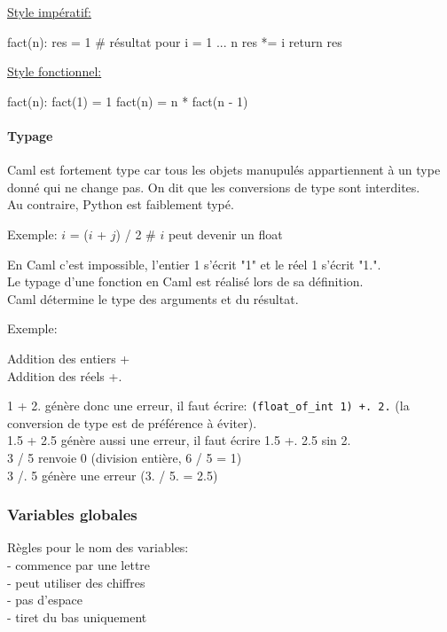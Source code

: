 \documentclass{article}
\newcommand{\code}[1]{\lstinline[style = mystyle]{#1}}
\begin{document}
						\underline{Style impératif:}
						
							\begin{case}
fact(n):
	res = 1 # résultat
	pour i = 1 ... n
		res *= i
	return res
							\end{case}
								
						\underline{Style fonctionnel:}
					
							\begin{case}
fact(n):
	fact(1) = 1
	fact(n) = n * fact(n - 1)
							\end{case}

				\paragraph{Typage}
				
					Caml est fortement type car tous les objets manupulés appartiennent à un type donné qui ne change pas. On dit que les conversions de type sont interdites.\\
					Au contraire, Python est faiblement typé.
					
					Exemple: $i$ = ($i$ + $j$) / 2 \# $i$ peut devenir un float

					En Caml c'est impossible, l'entier 1 s'écrit "1" et le réel 1 s'écrit "1.".\\
					Le typage d'une fonction en Caml est réalisé lors de sa définition.\\
					Caml détermine le type des arguments et du résultat.
					
					Exemple:
					
					Addition des entiers +\\
					Addition des réels +.
					
					1 + 2. génère donc une erreur, il faut écrire: \code{(float_of_int 1) +. 2.} (la conversion de type est de préférence à éviter).\\
					1.5 + 2.5 génère aussi une erreur, il faut écrire 1.5 +. 2.5
					sin 2.\\
					3 / 5 renvoie 0 (division entière, 6 / 5 = 1)\\
					3 /. 5 génère une erreur (3. / 5. = 2.5)
					
			\subsubsection{Variables globales}
					
				Règles pour le nom des variables:\\
				- commence par une lettre\\
				- peut utiliser des chiffres\\
				- pas d'espace\\
				- tiret du bas uniquement
					
\end{document}
